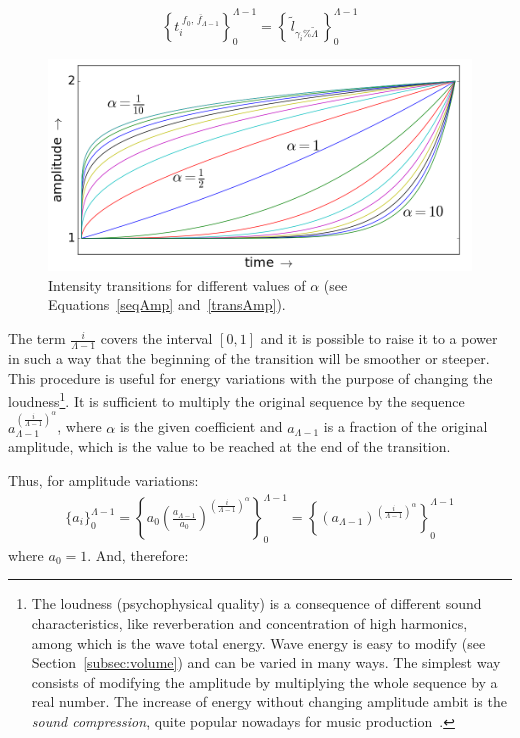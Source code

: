 \begin{equation}\label{serieAmostralLog}
 \left\{t_i^{\;\overline{f_0,\,f_{\Lambda-1}}}\right\}_0^{\Lambda-1}=\left\{\,\widetilde{l}_{\gamma_i \% \widetilde{\Lambda}}\,\right\}_0^{\Lambda-1}
\end{equation}

\begin{figure}[h!]
     \centering
         \includegraphics[width=.7\columnwidth]{figures/transicao_}
     \caption{Intensity transitions for different values of $\alpha$ (see Equations~\ref{seqAmp} and~\ref{transAmp}).}
         \label{fig:transicao}
\end{figure}

The term $\frac{i}{\Lambda-1}$ covers the interval $[0,1]$ and it is possible to raise it to a power in such a way that the beginning of the transition will be smoother or steeper. This procedure is useful for energy variations with the purpose of changing the loudness\footnote{The
loudness (psychophysical quality) is a consequence of different sound characteristics, like reverberation and concentration of high harmonics, among which is the wave total energy. Wave energy is easy to modify (see Section~\ref{subsec:volume}) and can be varied in many ways. The simplest way consists of modifying the amplitude by multiplying the whole sequence by a real number. The increase of energy without changing amplitude ambit is the \emph{sound compression}, quite popular nowadays for music production~\cite{guillaume}.}. It is sufficient to multiply the original sequence by the sequence $a_{\Lambda-1}^{\left( \frac{i}{\Lambda-1} \right )^\alpha}$, where $\alpha$ is the given coefficient and $a_{\Lambda-1}$ is a fraction of the original amplitude, which is the value to be reached at the end of the transition.

Thus, for amplitude variations:
\begin{equation}\label{seqAmp}
\begin{split}
 \{a_i\}_0^{\Lambda-1}= \left \{ a_0 \left ( \frac{a_{\Lambda-1}}{a_0} \right )^{\left ( \frac{i}{\Lambda-1} \right )^\alpha} \right \}_0^{\Lambda-1}= \left \{ \left ( {a_{\Lambda-1}} \right )^{\left ( \frac{i}{\Lambda-1} \right )^\alpha} \right \}_0^{\Lambda-1}
\end{split}
\end{equation}
where $a_0=1$. And, therefore:

